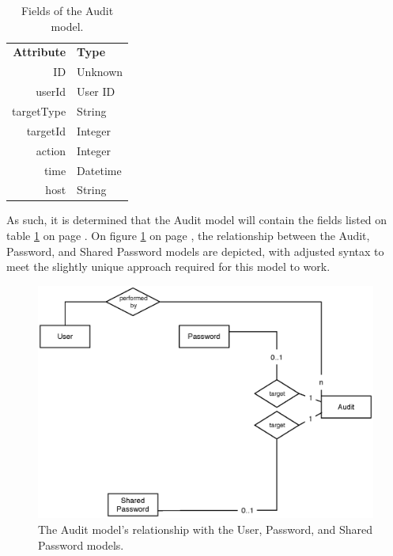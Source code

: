 			\begin{table}[p]
				\centering
				\begin{tabular}{r|l}
					\textbf{Attribute} 		& \textbf{Type} 		\\
					ID 						& Unknown 	\\
					userId 					& User ID 	\\
					targetType 				& String 	\\
					targetId				& Integer 	\\
					action					& Integer 	\\
					time  					& Datetime 	\\
					host  					& String 	\\
				\end{tabular}
				\caption{Fields of the Audit model.}
				\label{fig:model:audit}
			\end{table}

			As such, it is determined that the Audit model will contain the fields listed on table \ref{fig:model:audit} on page \pageref{fig:model:audit}. On figure \ref{fig:relationship:audit-user} on page \pageref{fig:relationship:audit-user}, the relationship between the Audit, Password, and Shared Password models are depicted, with adjusted syntax to meet the slightly unique approach required for this model to work.
			
			\begin{figure}[p]
				\centering
				\includegraphics[width=\textwidth]{figures/design/uml/erd/audit-user-password-sharedpassword.eps}
				\caption{The Audit model's relationship with the User, Password, and Shared Password models.}
				\label{fig:relationship:audit-user}
			\end{figure}

